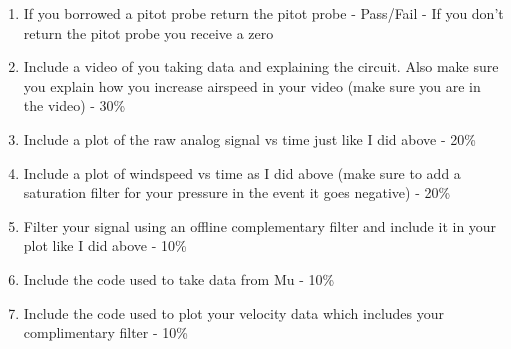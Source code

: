 \begin{enumerate}[itemsep=-5pt]
\item If you borrowed a pitot probe return the pitot probe - Pass/Fail - If you don’t return the pitot probe you receive a zero
\item Include a video of you taking data and explaining the circuit. Also make sure you explain how you increase airspeed in your video (make sure you are in the video) - 30\%
\item Include a plot of the raw analog signal vs time just like I did above - 20\%
\item Include a plot of windspeed vs time as I did above (make sure to add a saturation filter for your pressure in the event it goes negative) - 20\%
\item Filter your signal using an offline complementary filter and include it in your plot like I did above - 10\%
\item Include the code used to take data from Mu - 10\%
\item Include the code used to plot your velocity data which includes your complimentary filter - 10\%
\end{enumerate}
